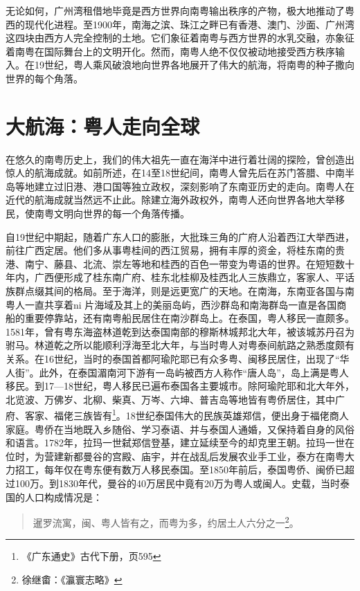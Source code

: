无论如何，广州湾租借地毕竟是西方世界向南粤输出秩序的产物，极大地推动了粤西的现代化进程。至1900年，南海之滨、珠江之畔已有香港、澳门、沙面、广州湾这四块由西方人完全控制的土地。它们象征着南粤与西方世界的水乳交融，亦象征着南粤在国际舞台上的文明开化。然而，南粤人绝不仅仅被动地接受西方秩序输入。在19世纪，粤人乘风破浪地向世界各地展开了伟大的航海，将南粤的种子撒向世界的每个角落。


\section{大航海：粤人走向全球}

\indent 在悠久的南粤历史上，我们的伟大祖先一直在海洋中进行着壮阔的探险，曾创造出惊人的航海成就。如前所述，在14至18世纪间，南粤人曾先后在苏门答腊、中南半岛等地建立过旧港、港口国等独立政权，深刻影响了东南亚历史的走向。南粤人在近代的航海成就当然远不止此。除建立海外政权外，南粤人还向世界各地大举移民，使南粤文明向世界的每一个角落传播。

自19世纪中期起，随着广东人口的膨胀，大批珠三角的广府人沿着西江大举西进，前往广西定居。他们多从事粤桂间的西江贸易，拥有丰厚的资金，将桂东南的贵港、南宁、藤县、北流、崇左等地和桂西的百色一带变为粤语的世界。在短短数十年内，广西便形成了桂东南广府、桂东北桂柳及桂西北人三族鼎立，客家人、平话族群点缀其间的格局。至于海洋，则是远更宽广的天地。在南海，东南亚各国与南粤人一直共享着ni 片海域及其上的美丽岛屿，西沙群岛和南海群岛一直是各国商船的重要停靠站，还有南粤船民居住在南沙群岛上。在泰国，粤人移民一直颇多。1581年，曾有粤东海盗林道乾到达泰国南部的穆斯林城邦北大年，被该城苏丹召为驸马。林道乾之所以能顺利浮海至北大年，与当时粤人对粤泰间航路之熟悉度颇有关系。在16世纪，当时的泰国首都阿瑜陀耶已有众多粤、闽移民居住，出现了“华人街”。此外，在泰国湄南河下游有一岛屿被西方人称作“唐人岛”，岛上满是粤人移民。到17—18世纪，粤人移民已遍布泰国各主要城市。除阿瑜陀耶和北大年外，北览波、万佛岁、北柳、柴真、万岑、六坤、普吉岛等地皆有粤侨居住，其中广府、客家、福佬三族皆有\footnote{《广东通史》古代下册，页595}。18世纪泰国伟大的民族英雄郑信，便出身于福佬商人家庭。粤侨在当地既入乡随俗、学习泰语、并与泰国人通婚，又保持着自身的风俗和语言。1782年，拉玛一世弑郑信登基，建立延续至今的却克里王朝。拉玛一世在位时，为营建新都曼谷的宫殿、庙宇，并在战乱后发展农业手工业，泰方在南粤大力招工，每年仅在粤东便有数万人移民泰国。至1850年前后，泰国粤侨、闽侨已超过100万。到1830年代，曼谷的40万居民中竟有20万为粤人或闽人。史载，当时泰国的人口构成情况是：

\begin{quote}

暹罗流寓，闽、粤人皆有之，而粤为多，约居土人六分之一\footnote{徐继畬：《瀛寰志略》}。

\end{quote}

